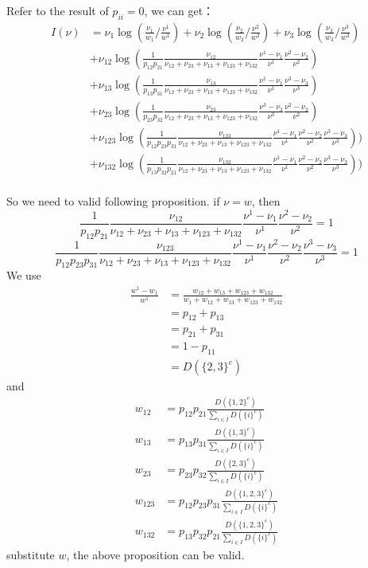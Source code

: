 \documentclass[11pt,en,cite=authoryear]{elegantpaper}
\begin{document}
Refer to the result of $p_{ii}=0$, we can get：
\begin{align*}
    I(\nu)
    &= 
    \nu_1 \log(\frac{\nu_1}{w_1} / \frac{\nu^1}{w^1})
    + \nu_2 \log(\frac{\nu_2}{w_2} / \frac{\nu^2}{w^2})
    + \nu_3 \log(\frac{\nu_3}{w_3} / \frac{\nu^3}{w^3}) \\
    &+\nu_{12} \log(\frac{1}{p_{12}p_{21}} \frac{\nu_{12}}{\nu_{12}+\nu_{23}+\nu_{13}+\nu_{123}+\nu_{132}} 
    \frac{\nu^{1}-\nu_{1}}{\nu^{1}}\frac{\nu^{2}-\nu_{2}}{\nu^{2}}) \\
    &+ \nu_{13} \log(\frac{1}{p_{13}p_{31}} \frac{\nu_{13}}{\nu_{12}+\nu_{23}+\nu_{13}+\nu_{123}+\nu_{132}}
    \frac{\nu^{1}-\nu_{1}}{\nu^{1}}\frac{\nu^{3}-\nu_{3}}{\nu^{3}}) \\
    &+ \nu_{23} \log(\frac{1}{p_{23}p_{32}} \frac{\nu_{23}}{\nu_{12}+\nu_{23}+\nu_{13}+\nu_{123}+\nu_{132}} 
    \frac{\nu^{3}-\nu_{3}}{\nu^{3}}\frac{\nu^{2}-\nu_{2}}{\nu^{2}}) \\
    &+ \nu_{123} \log(\frac{1}{p_{12}p_{23}p_{31}} \frac{\nu_{123}}{\nu_{12}+\nu_{23}+\nu_{13}+\nu_{123}+\nu_{132}}
    \frac{\nu^{1}-\nu_{1}}{\nu^{1}}\frac{\nu^{2}-\nu_{2}}{\nu^{2}} \frac{\nu^{3}-\nu_{3}}{\nu^{3}})) \\
    &+ \nu_{132} \log(\frac{1}{p_{13}p_{32}p_{21}} \frac{\nu_{132}}{\nu_{12}+\nu_{23}+\nu_{13}+\nu_{123}+\nu_{132}}
    \frac{\nu^{1}-\nu_{1}}{\nu^{1}}\frac{\nu^{2}-\nu_{2}}{\nu^{2}} \frac{\nu^{3}-\nu_{3}}{\nu^{3}})) \\
\end{align*}

So we need to valid following proposition. if $\nu=w$, then
$$
\frac{1}{p_{12}p_{21}} \frac{\nu_{12}}{\nu_{12}+\nu_{23}+\nu_{13}+\nu_{123}+\nu_{132}} \frac{\nu^{1}-\nu_{1}}{\nu^{1}}\frac{\nu^{2}-\nu_{2}}{\nu^{2}} = 1
$$
$$
\frac{1}{p_{12}p_{23}p_{31}} \frac{\nu_{123}}{\nu_{12}+\nu_{23}+\nu_{13}+\nu_{123}+\nu_{132}}\frac{\nu^{1}-\nu_{1}}{\nu^{1}}\frac{\nu^{2}-\nu_{2}}{\nu^{2}} \frac{\nu^{3}-\nu_{3}}{\nu^{3}} = 1
$$
We use
\begin{align*}
    \frac{w^{1}-w_{1}}{w^{1}} &= \frac{w_{12}+w_{13}+w_{123}+w_{132}}{w_{1}+w_{12}+w_{13}+w_{123}+w_{132}} \\
    &= p_{12}+p_{13} \\
    &= p_{21}+p_{31} \\
    &= 1 - p_{11} \\
    &= D(\{2, 3\}^c)
\end{align*}
and
\begin{align*}
    w_{12} &= p_{12}p_{21} \frac{D(\{1, 2\}^c)}{\sum_{i\in I} D(\{i\}^c)} \\
    w_{13} &= p_{13}p_{31} \frac{D(\{1, 3\}^c)}{\sum_{i\in I} D(\{i\}^c)} \\
    w_{23} &= p_{23}p_{32} \frac{D(\{2, 3\}^c)}{\sum_{i\in I} D(\{i\}^c)} \\
    w_{123} &= p_{12}p_{23}p_{31} \frac{D(\{1, 2, 3\}^c)}{\sum_{i\in I} D(\{i\}^c)} \\
    w_{132} &= p_{13}p_{32}p_{21} \frac{D(\{1, 2, 3\}^c)}{\sum_{i\in I} D(\{i\}^c)}
\end{align*}
substitute $w$, the above proposition can be valid.
\end{document}
